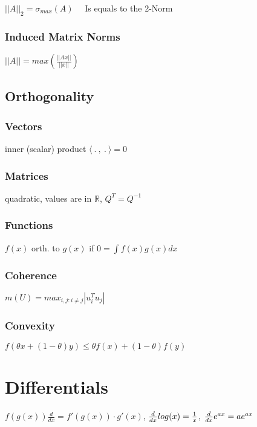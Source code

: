\documentclass[a4paper,11pt,twocolumn]{article}
\begin{document}
$||A||_2 = \sigma_{max}(A)$ 
~~Is equals to the 2-Norm

\subsubsection{Induced Matrix Norms}
$ ||A|| = max \left( \frac{ ||Ax|| }{ ||x|| } \right)$

\subsection{Orthogonality}

\subsubsection{Vectors} 

inner (scalar) product $\langle ~.~,~.~ \rangle = 0$

\subsubsection{Matrices} 

quadratic, values are in $\mathbb{R}$, $Q^T = Q^{-1}$

\subsubsection{Functions}

$f(x)$ orth. to $g(x)$ if $0 = \int f(x) g(x) dx $

\subsubsection{Coherence}

$m(U)= max_{i,j:i\neq j} | u_i^T u_j|$

\subsubsection{Convexity}

$f(\theta x + (1-\theta)y) \leq \theta f(x) + (1-\theta) f(y)$

\section{Differentials}

$ f(g(x)) \frac{d}{dx} = f'(g(x)) \cdot g'(x)$, $ {d \over {dx}} log(x) = {1 \over x}$, $ {d \over {dx}} e^{ax} = ae^{ax}$
\end{document}
